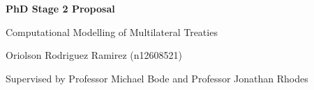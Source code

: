\begin{titlepage}
  \begin{center}
    \vspace*{4cm}

    {\LARGE\bfseries PhD Stage 2 Proposal}

    \vspace{1.5em}

    {\Large Computational Modelling of Multilateral Treaties}

    \vspace{3em}

    {\large Oriolson Rodriguez Ramirez (n12608521)}

    \vspace{1em}

    {\large Supervised by Professor Michael Bode and Professor Jonathan Rhodes}
  \end{center}
\end{titlepage}